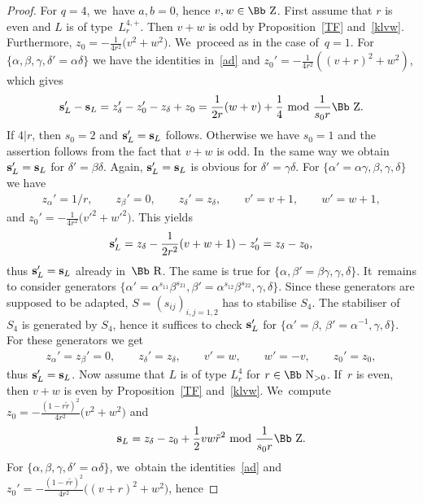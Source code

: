 \documentclass[10pt,a4paper]{amsart}
\newcommand\RR{{\mbox{\Bb R}}}
\newcommand\NN{{\mbox{\Bb N}}}
\newcommand\ZZ{{\mbox{\Bb Z}}}
\newcommand\bs{\textbf{{\rm \textbf{s}}}}
\numberwithin{equation}{section}
\begin{document}
\begin{proof}
For $q=4$, we~have $a,b=0$, hence $v,w\in\ZZ$. First assume that $r$ is even and $L$ is of type~$L_r^{4,+}$. Then $v+w$ is odd by Proposition~\ref{TF} and~\eqref{klvw}. Furthermore, $z_0=-\frac1{4r^2}\big(v^2+w^2\big)$. We~proceed as in the case of~$q=1$. For $\{\alpha,\beta,\gamma,\delta'=\alpha\delta\}$ we have the identities in~\eqref{ad} and $z_0'=-\frac1{4r^2}((v+r)^2+w^2)$, which gives
\begin{gather*}
\bs_L'-\bs_L=z_\delta'-z_0'-z_\delta+z_0=\frac1{2r} (w+v)+\frac14\ {\rm mod}\ \frac{1}{s_0r}\ZZ.
\end{gather*}
If $4|r$, then $s_0=2$ and $\bs_L'=\bs_L$ follows. Otherwise we have $s_0=1$ and the assertion follows from the fact that $v+w$ is odd. In~the same way we obtain~$\bs_L'=\bs_L$ for $\delta'=\beta\delta$. Again, $\bs_L'=\bs_L$ is obvious for $\delta'=\gamma\delta$. For $\{\alpha'=\alpha\gamma,\beta,\gamma,\delta\}$ we have
\begin{gather}\label{eo2}
z_\alpha'= 1/r,\qquad z_\beta'=0,\qquad z_\delta'= z_\delta,\qquad v'=v+1,\qquad w'=w+1,
\end{gather}
and $z_0'=-\frac1{4r^2}\big(v'^2+w'^2\big)$. This yields
\begin{gather*}
\bs_L'=z_\delta-\frac 1{2r^2}(v+w+1)-z_0'=z_\delta-z_0,
\end{gather*}
thus $\bs_L'=\bs_L$ already in~$\RR$. The same is true for $\{\alpha,\beta'=\beta\gamma,\gamma,\delta\}$. It~remains to consider generators $\big\{\alpha'=\alpha^{s_{11}}\beta^{s_{21}}, \beta'=\alpha^{s_{12}}\beta^{s_{22}}, \gamma, \delta \big\}$. Since these generators are supposed to be adapted, $S=(s_{ij})_{i,j=1,2}$ has to stabilise $S_4$. The stabiliser of~$S_4$ is generated by $S_4$, hence it suffices to check $\bs_L'$ for $\big\{\alpha'=\beta,\, \beta'=\alpha^{-1},\gamma,\delta\big\}$. For these generators we get
\begin{gather}\label{eo3}
 z_\alpha'= z_\beta'=0,\qquad z_\delta'= z_\delta,\qquad v'=w,\qquad w'=-v,\qquad z_0'=z_0,
\end{gather}
thus $\bs_L'=\bs_L$. Now assume that $L$ is of type $L_r^{4}$ for $r\in\NN_{>0}$. If~$r$ is even, then $v+w$ is even by Proposition~\ref{TF} and~\eqref{klvw}. We~compute $z_0=-\frac{(1-r\tilde r)^2}{4r^2}\big(v^2+w^2\big)$ and
\begin{gather*}
\bs_L=z_\delta-z_0+\frac{1}{2}vw\tilde r^2\ {\rm mod}\ \frac{1}{s_0r}\ZZ.
\end{gather*}
For $\{\alpha,\beta,\gamma,\delta'=\alpha\delta\}$, we~obtain the identities~\eqref{ad} and $z_0'=-\frac{(1-r\tilde r)^2}{4r^2}\big((v+r)^2+w^2\big)$, hence

\end{proof}
\end{document}
